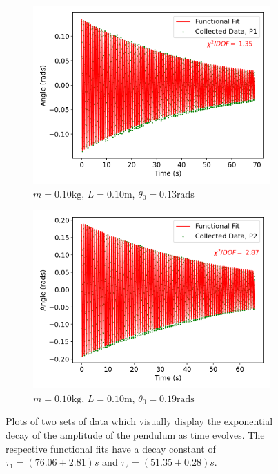 

\begin{figure}[H]
\centering
\begin{subfigure}[t]{0.5\textwidth}
  \centering
  \includegraphics[width=1\textwidth]{Plots/P1.png}
  \caption{\small{$m = 0.10\text{kg}$, $L = 0.10\text{m}$, $\theta_0 = 0.13\text{rads}$}}
  \label{exponential_decay1}
\end{subfigure}%
\begin{subfigure}[t]{.5\textwidth}
  \centering
  \includegraphics[width=\textwidth]{Plots/P2.png}
  \caption{\small{$m = 0.10\text{kg}$, $L = 0.10\text{m}$, $\theta_0 = 0.19\text{rads}$ }}
  \label{exponential_decay2}
\end{subfigure}
\caption{\small{Plots of two sets of data which visually display the exponential decay of the amplitude of the pendulum as time evolves. The respective functional fits have a decay constant of $\tau_1 = (76.06\pm 2.81)s$ and $\tau_2 = (51.35 \pm 0.28) s$.}}
\end{figure}


